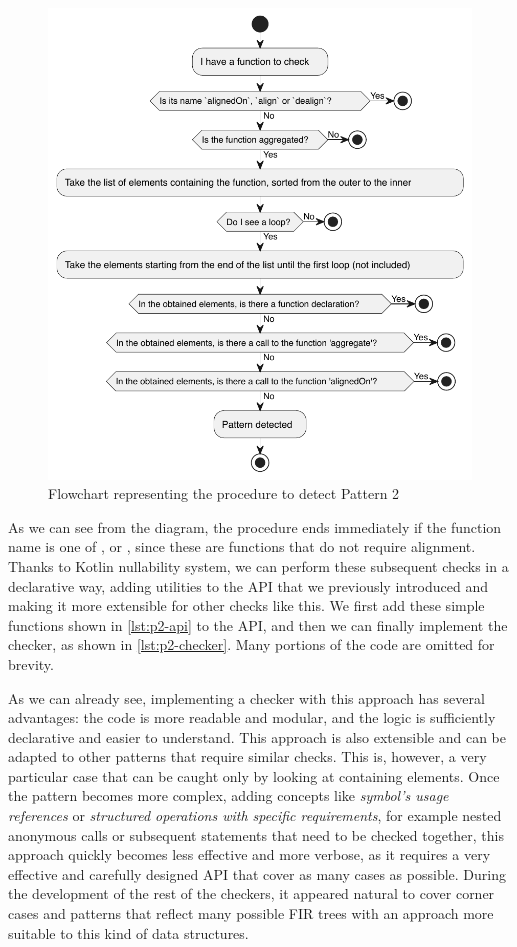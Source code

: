 \documentclass[12pt,a4paper,openright,twoside]{book}
\begin{document}
\begin{figure}
  \centering
  \includegraphics[width=.5\linewidth]{figures/p2-flowchart.pdf}
  \caption{Flowchart representing the procedure to detect Pattern 2}
  \label{fig:p2-flowchart}
\end{figure}

As we can see from the diagram, the procedure ends immediately if the function
name is one of ,  or , since these are
functions that do not require alignment. Thanks to Kotlin nullability system, we
can perform these subsequent checks in a declarative way, adding utilities to
the API that we previously introduced and making it more extensible for other
checks like this.
%
We first add these simple functions shown in \cref{lst:p2-api} to the API, and
then we can finally implement the checker, as shown in \cref{lst:p2-checker}. 
Many portions of the code are omitted for brevity.





As we can already see, implementing a checker with this approach has several
advantages: the code is more readable and modular, and the logic is sufficiently
declarative and easier to understand. This approach is also extensible and can
be adapted to other patterns that require similar checks.
%
This is, however, a very particular case that can be caught only by looking at
containing elements. Once the pattern becomes more complex, adding concepts like
\emph{symbol's usage references} or \emph{structured operations with specific
requirements}, for example nested anonymous calls or subsequent statements that
need to be checked together, this approach quickly becomes less effective and
more verbose, as it requires a very effective and carefully designed API that
cover as many cases as possible. 
%
During the development of the rest of the checkers, it appeared natural to cover
corner cases and patterns that reflect many possible \ac{FIR} trees with an
approach more suitable to this kind of data structures.
\end{document}
